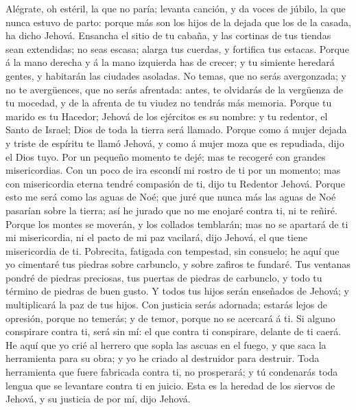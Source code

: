  Alégrate, oh estéril, la que no paría; levanta canción, y
da voces de júbilo, la que nunca estuvo de parto: porque más son los
hijos de la dejada que los de la casada, ha dicho Jehová. 
Ensancha el sitio de tu cabaña, y las cortinas de tus tiendas sean
extendidas; no seas escasa; alarga tus cuerdas, y fortifica tus estacas.
 Porque á la mano derecha y á la mano izquierda has de
crecer; y tu simiente heredará gentes, y habitarán las ciudades
asoladas.  No temas, que no serás avergonzada; y no te
avergüences, que no serás afrentada: antes, te olvidarás de la vergüenza
de tu mocedad, y de la afrenta de tu viudez no tendrás más memoria.
 Porque tu marido es tu Hacedor; Jehová de los ejércitos
es su nombre: y tu redentor, el Santo de Israel; Dios de toda la tierra
será llamado.  Porque como á mujer dejada y triste de
espíritu te llamó Jehová, y como á mujer moza que es repudiada, dijo el
Dios tuyo.  Por un pequeño momento te dejé; mas te
recogeré con grandes misericordias.  Con un poco de ira
escondí mi rostro de ti por un momento; mas con misericordia eterna
tendré compasión de ti, dijo tu Redentor Jehová.  Porque
esto me será como las aguas de Noé; que juré que nunca más las aguas de
Noé pasarían sobre la tierra; así he jurado que no me enojaré contra ti,
ni te reñiré.  Porque los montes se moverán, y los
collados temblarán; mas no se apartará de ti mi misericordia, ni el
pacto de mi paz vacilará, dijo Jehová, el que tiene misericordia de ti.
 Pobrecita, fatigada con tempestad, sin consuelo; he aquí
que yo cimentaré tus piedras sobre carbunclo, y sobre zafiros te
fundaré.  Tus ventanas pondré de piedras preciosas, tus
puertas de piedras de carbunclo, y todo tu término de piedras de buen
gusto.  Y todos tus hijos serán enseñados de Jehová; y
multiplicará la paz de tus hijos.  Con justicia serás
adornada; estarás lejos de opresión, porque no temerás; y de temor,
porque no se acercará á ti.  Si alguno conspirare contra
ti, será sin mí: el que contra ti conspirare, delante de ti caerá.
 He aquí que yo crié al herrero que sopla las ascuas en
el fuego, y que saca la herramienta para su obra; y yo he criado al
destruidor para destruir.  Toda herramienta que fuere
fabricada contra ti, no prosperará; y tú condenarás toda lengua que se
levantare contra ti en juicio. Esta es la heredad de los siervos de
Jehová, y su justicia de por mí, dijo Jehová.

